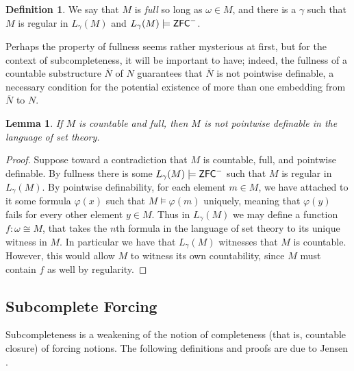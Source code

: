 \documentclass{amsart}
\newtheorem{lemma}[theorem]{Lemma}
\theoremstyle{definition}
\newtheorem{definition}[theorem]{Definition}
\theoremstyle{remark}
\newcommand{\N}{{\overline{N}}}
\newcommand{\ZFC}{\textup{\ensuremath{\textsf{ZFC}}}}
\begin{document}
\begin{definition} We say that $M$ is \emph{full} so long as $\omega \in M$, and there is a $\gamma$ such that $M$ is regular in $L_\gamma(M)$ and $L_\gamma(M) \models \ZFC^-$.
\end{definition}

Perhaps the property of fullness seems rather mysterious at first, but for the context of subcompleteness, it will be important to have; indeed, the fullness of a countable substructure $\N$ of $N$ guarantees that $\N$ is not pointwise definable, a necessary condition for the potential existence
of more than one embedding from $\N$ to $N$.

\begin{lemma} If $M$ is countable and full, then $M$ is not pointwise definable in the language of set theory. \end{lemma}
\begin{proof} Suppose toward a contradiction that $M$ is countable, full, and pointwise definable. By fullness there is some $L_\gamma(M) \models \ZFC^-$ such that $M$ is regular in $L_\gamma(M)$. By pointwise definability, for each element $m \in M$, we have attached to it some formula $\varphi(x)$ such that $M \models \varphi(m)$ uniquely, meaning that $\varphi(y)$ fails for every other element $y \in M$. Thus in $L_\gamma(M)$ we may define a function $f: \omega \cong M$, that takes the $n$th formula in the language of set theory to its unique witness in $M$. In particular we have that $L_\gamma(M)$ witnesses that $M$ is countable. However, this would allow $M$ to witness its own countability, since $M$ must contain $f$ as well by regularity. \end{proof} 

\subsection{Subcomplete Forcing} \label{subsec:subcomplete}
Subcompleteness is a weakening of the notion of completeness (that is, countable closure) of forcing notions. The following definitions and proofs are due to Jensen \cite[Ch.~3]{Jensen:2014}.
\end{document}
